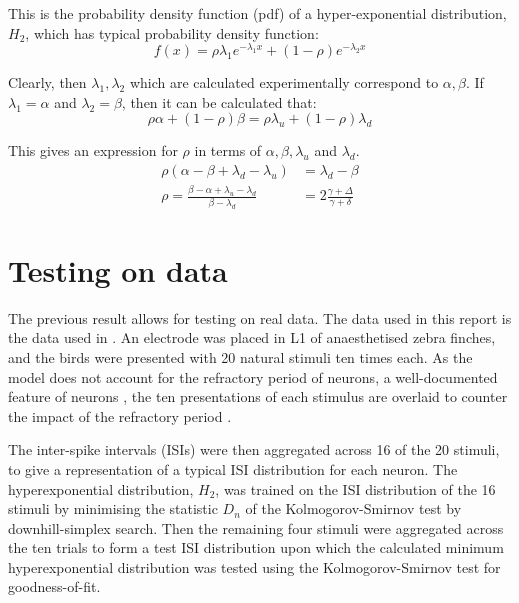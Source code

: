 This is the probability density function (pdf) of a hyper-exponential distribution, $H_2$, which has typical probability density function:
\begin{equation}
f(x) = \rho\lambda_1 e^{-\lambda_1 x} + (1-\rho) e^{-\lambda_2 x}
\end{equation}

Clearly, then $\lambda_1, \lambda_2$ which are calculated experimentally correspond to $\alpha,\beta$.  If $\lambda_1 = \alpha$ and $\lambda_2 = \beta$, then it can be calculated that:
\begin{equation}
\rho\alpha + (1-\rho) \beta = \rho\lambda_u + (1-\rho)\lambda_d
\end{equation}

This gives an expression for $\rho$ in terms of $\alpha, \beta, \lambda_u$ and $\lambda_d$.
\begin{equation}
\begin{split}
\rho(\alpha - \beta + \lambda_d - \lambda_u) &= \lambda_d-\beta \\
\rho = \frac{\beta-\alpha +\lambda_u- \lambda_d}{\beta-\lambda_d} &= 2\frac{\gamma+\Delta}{\gamma+\delta}
\end{split}
\end{equation}

\section{Testing on data}
The previous result allows for testing on real data.  The data used in this report is the data used in \cite{SenEtAl2001a}.  An electrode was placed in L1 of anaesthetised zebra finches, and the birds were presented with 20 natural stimuli ten times each.  As the model does not account for the refractory period of neurons, a well-documented feature of neurons \cite{OlshausenField2004a} , the ten presentations of each stimulus are overlaid to counter the impact of the refractory period \cite{BerryMeister1998a}. 

The inter-spike intervals (ISIs) were then aggregated across 16 of the 20 stimuli, to give a representation of a typical ISI distribution for each neuron.  The hyperexponential distribution, $H_2$, was trained on the ISI distribution of the 16 stimuli by minimising the statistic $D_n$ of the Kolmogorov-Smirnov test \cite{Massey1951a} by downhill-simplex search.  Then the remaining four stimuli were aggregated across the ten trials to form a test ISI distribution upon which the calculated minimum hyperexponential distribution was tested using the Kolmogorov-Smirnov test for goodness-of-fit.

